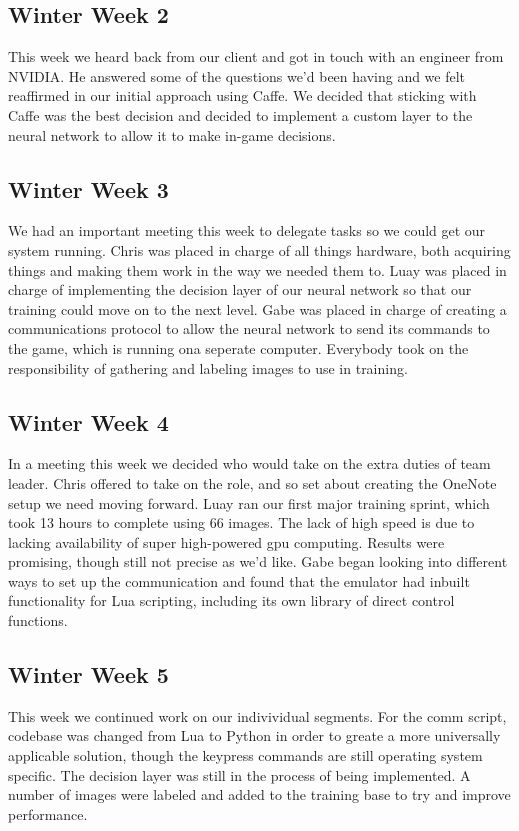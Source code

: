 \documentclass[onecolumn, draftclsnofoot,10pt, compsoc]{IEEEtran}
\begin{document}
\subsection{Winter Week 2}
This week we heard back from our client and got in touch with an engineer from NVIDIA. 
He answered some of the questions we'd been having and we felt reaffirmed in our initial approach using Caffe.
We decided that sticking with Caffe was the best decision and decided to implement a custom layer to the neural network to allow it to make in-game decisions.

\subsection{Winter Week 3}
We had an important meeting this week to delegate tasks so we could get our system running. 
Chris was placed in charge of all things hardware, both acquiring things and making them work in the way we needed them to.
Luay was placed in charge of implementing the decision layer of our neural network so that our training could move on to the next level.
Gabe was placed in charge of creating a communications protocol to allow the neural network to send its commands to the game, which is running ona seperate computer.
Everybody took on the responsibility of gathering and labeling images to use in training.

\subsection{Winter Week 4}
In a meeting this week we decided who would take on the extra duties of team leader. 
Chris offered to take on the role, and so set about creating the OneNote setup we need moving forward.
Luay ran our first major training sprint, which took 13 hours to complete using 66 images. 
The lack of high speed is due to lacking availability of super high-powered gpu computing. 
Results were promising, though still not precise as we'd like.
Gabe began looking into different ways to set up the communication and found that the emulator had inbuilt functionality for Lua scripting, including its own library of direct control functions.

\subsection{Winter Week 5}
This week we continued work on our indivividual segments. 
For the comm script, codebase was changed from Lua to Python in order to greate a more universally applicable solution, though the keypress commands are still operating system specific.
The decision layer was still in the process of being implemented.
A number of images were labeled and added to the training base to try and improve performance.
\end{document}

